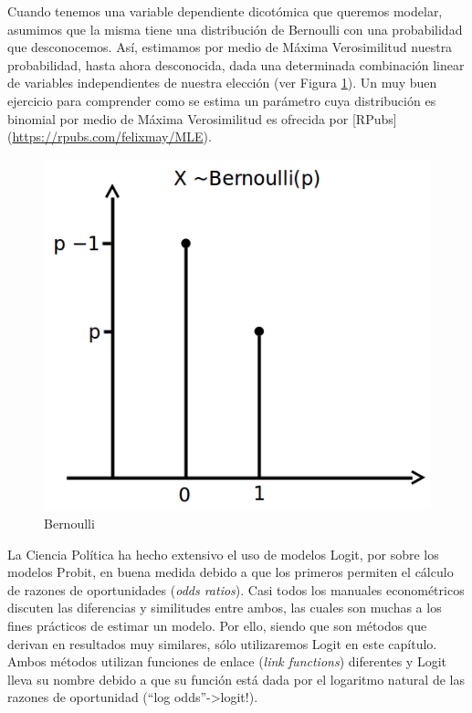 \documentclass[]{book}
\begin{document}
Cuando tenemos una variable dependiente dicotómica que queremos modelar,
asumimos que la misma tiene una distribución de Bernoulli con una
probabilidad que desconocemos. Así, estimamos por medio de Máxima
Verosimilitud nuestra probabilidad, hasta ahora desconocida, dada una
determinada combinación linear de variables independientes de nuestra
elección (ver Figura \ref{fig:bin-bernou}). Un muy buen ejercicio para
comprender como se estima un parámetro cuya distribución es binomial por
medio de Máxima Verosimilitud es ofrecida por {[}RPubs{]}
(\url{https://rpubs.com/felixmay/MLE}).

\begin{figure}

{\centering \includegraphics[width=6.75in]{00-images/bin-bernou} 

}

\caption{Bernoulli}\label{fig:bin-bernou}
\end{figure}

La Ciencia Política ha hecho extensivo el uso de modelos Logit, por
sobre los modelos Probit, en buena medida debido a que los primeros
permiten el cálculo de razones de oportunidades (\emph{odds ratios}).
Casi todos los manuales econométricos discuten las diferencias y
similitudes entre ambos, las cuales son muchas a los fines prácticos de
estimar un modelo. Por ello, siendo que son métodos que derivan en
resultados muy similares, sólo utilizaremos Logit en este capítulo.
Ambos métodos utilizan funciones de enlace (\emph{link functions})
diferentes y Logit lleva su nombre debido a que su función está dada por
el logaritmo natural de las razones de oportunidad (``log
odds''-\textgreater{}logit!).
\end{document}
